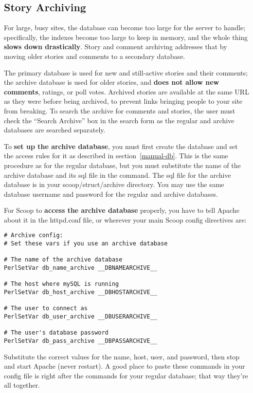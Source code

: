 \subsection{Story Archiving}
\label{features-archive}

For large, busy sites, the database can become too large for the server to handle; specifically, the indexes become too large to keep in memory, and the whole thing {\bf slows down drastically}.  Story and comment archiving addresses that by moving older stories and comments to a secondary database.

The primary database is used for new and still-active stories and their comments; the archive database is used for older stories, and {\bf does not allow new comments}, ratings, or poll votes.  Archived stories are available at the same URL as they were before being archived, to prevent links bringing people to your site from breaking.  To search the archive for comments and stories, the user must check the ``Search Archive'' box in the search form as the regular and archive databases are searched separately.

To {\bf set up the archive database}, you must first create the database and set the access rules for it as described in section~\ref{manual-db}.  This is the same procedure as for the regular database, but you must substitute the name of the archive database and its sql file in the command.  The sql file for the archive database is in your scoop/struct/archive directory.  You may use the same database username and password for the regular and archive databases.

For Scoop to {\bf access the archive database} properly, you have to tell Apache about it in the httpd.conf file, or wherever your main Scoop config directives are:

\begin{verbatim}
# Archive config:
# Set these vars if you use an archive database

# The name of the archive database
PerlSetVar db_name_archive __DBNAMEARCHIVE__

# The host where mySQL is running
PerlSetVar db_host_archive __DBHOSTARCHIVE__

# The user to connect as
PerlSetVar db_user_archive __DBUSERARCHIVE__

# The user's database password
PerlSetVar db_pass_archive __DBPASSARCHIVE__
\end{verbatim}

Substitute the correct values for the name, host, user, and password, then stop and start Apache (never restart).  A good place to paste these commands in your config file is right after the commands for your regular database; that way they're all together.

